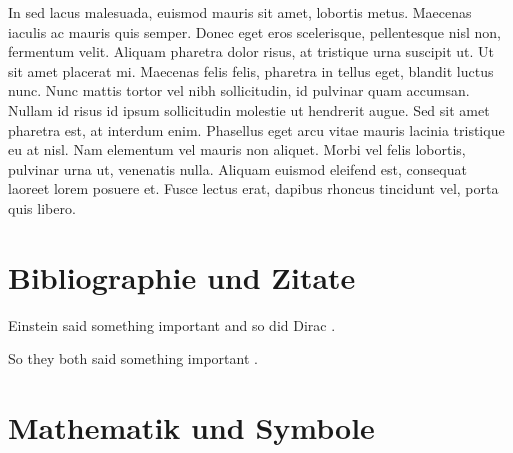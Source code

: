 \documentclass[12pt, a4paper, twopage]{scrartcl}
\begin{document}
\begin{mdframed}[style=simple,frametitle={Mein style.}]

In sed lacus malesuada, euismod mauris sit amet, lobortis metus. Maecenas iaculis ac mauris quis semper. Donec eget eros scelerisque, pellentesque nisl non, fermentum velit. Aliquam pharetra dolor risus, at tristique urna suscipit ut. Ut sit amet placerat mi. Maecenas felis felis, pharetra in tellus eget, blandit luctus nunc. Nunc mattis tortor vel nibh sollicitudin, id pulvinar quam accumsan. Nullam id risus id ipsum sollicitudin molestie ut hendrerit augue. Sed sit amet pharetra est, at interdum enim. Phasellus eget arcu vitae mauris lacinia tristique eu at nisl. Nam elementum vel mauris non aliquet. Morbi vel felis lobortis, pulvinar urna ut, venenatis nulla. Aliquam euismod eleifend est, consequat laoreet lorem posuere et. Fusce lectus erat, dapibus rhoncus tincidunt vel, porta quis libero. 

\end{mdframed}




\section{Bibliographie und Zitate}
Einstein said something important\cite{einstein} and so did Dirac \cite{dirac}.

So they both said something important \cite{dirac,einstein}.


\section{Mathematik und Symbole}
\end{document}
